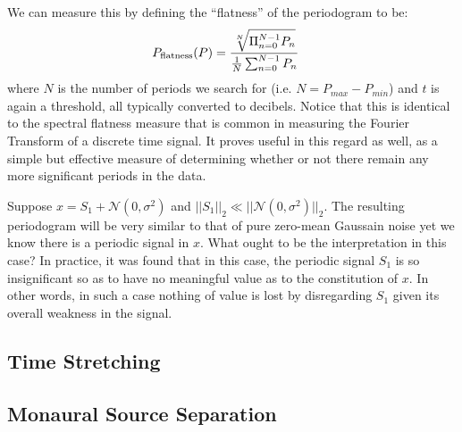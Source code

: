     We can measure this by defining the ``flatness'' of the periodogram to be:
    \begin{align} \label{eq:audioEffects:flatness}
        P_{\text{flatness}}(P) &= \frac
            {
                \sqrt[N]{\Pi_{n=0}^{N-1} P_n}
            }
            {
                \frac{1}{N} \sum_{n=0}^{N-1} P_n
            }
    \end{align}
    where $N$ is the number of periods we search for (i.e. $N = P_{max} - P_{min}$) and $t$ is again a threshold, all typically converted to decibels. Notice that this is identical to the spectral flatness measure that is common in measuring the Fourier Transform of a discrete time signal. It proves useful in this regard as well, as a simple but effective measure of determining whether or not there remain any more significant periods in the data.

    Suppose $x = S_1 + \mathcal{N}(0, \sigma^2)$ and $||S_1||_2 \ll ||\mathcal{N}(0, \sigma^2)||_2$. The resulting periodogram will be very similar to that of pure zero-mean Gaussain noise yet we know there is a periodic signal in $x$. What ought to be the interpretation in this case? In practice, it was found that in this case, the periodic signal $S_1$ is so insignificant so as to have no meaningful value as to the constitution of $x$. In other words, in such a case nothing of value is lost by disregarding $S_1$ given its overall weakness in the signal.


\subsection{Time Stretching}

\subsection{Monaural Source Separation}
